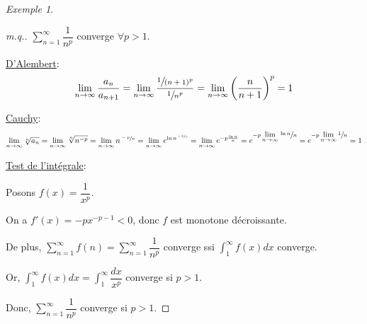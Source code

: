 \documentclass{report}
\newcommand*{\dsum}[4]{\displaystyle\sum_{#1=#2}^{#3}#4}
\newcommand*{\dlim}[3]{\displaystyle\lim_{#1 \to #2}#3}
\newcommand*{\dint}[3]{\displaystyle\int_{#1}^{#2}#3}
\theoremstyle{definition}
\theoremstyle{remark}
\newtheorem*{exem}{Exemple}
\begin{document}
	\begin{exem}~

		\begin{proof}[m.q.]
			$\dsum{n}{1}{\infty}{\dfrac{1}{n^p}}$ converge $\forall p > 1$.

			\underline{D'Alembert}:
			\[
			\dlim{n}{\infty}{\dfrac{a_n}{a_{n+1}}} = \dlim{n}{\infty}{\dfrac{\sfrac{1}{(n+1)^p}}{\sfrac{1}{n^p}}} = \dlim{n}{\infty}{\left( \dfrac{n}{n+1} \right)^p} = 1
			\]

			\underline{Cauchy}:
			\[
			\dlim{n}{\infty}{\sqrt[n]{a_n}} = \dlim{n}{\infty}{\sqrt[n]{n^{-p}}} = \dlim{n}{\infty}{n^{\sfrac{-p}{n}}} = \dlim{n}{\infty}{e^{\ln n^{\sfrac{-p}{n}}}} = \dlim{n}{\infty}{e^{-p\frac{\ln n}{n}}} = e^{-p \dlim{n}{\infty}{\sfrac{\ln n}{n}}} = e^{-p \dlim{n}{\infty}{\sfrac{1}{n}}} = 1
			\]

			\underline{Test de l'int\'egrale}:

			Posons $f(x) = \dfrac{1}{x^p}$.

			On a $f'(x) = -px^{-p-1}<0$, donc $f$ est monotone d\'ecroissante.

			De plus, $\dsum{n}{1}{\infty}{f(n)} = \dsum{n}{1}{\infty}{\dfrac{1}{n^p}}$ converge ssi $\dint{1}{\infty}{f(x)dx}$ converge.

			Or, $\dint{1}{\infty}{f(x)dx} = \dint{1}{\infty}{\dfrac{dx}{x^p}}$ converge si $p>1$.

			Donc, $\dsum{n}{1}{\infty}{\dfrac{1}{n^p}}$ converge si $p>1$.
		\end{proof}
	\end{exem}
\end{document}
